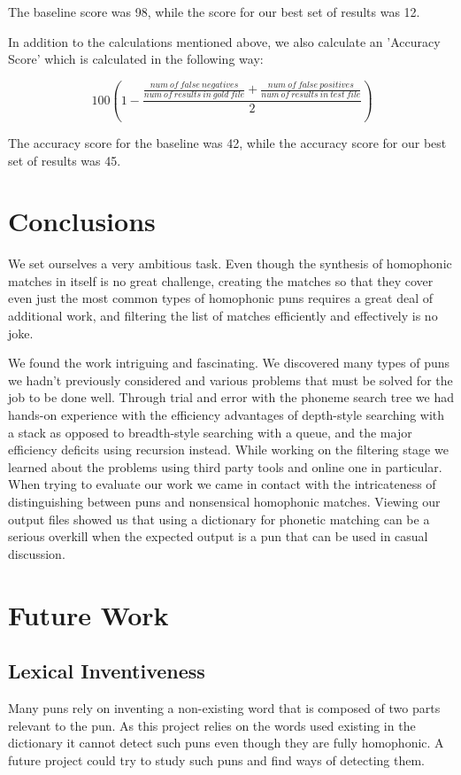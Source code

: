 \documentclass[11pt,a4paper]{article}
\begin{document}
The baseline score was 98, while the score for our best set of results was 12.

In addition to the calculations mentioned above, we also calculate an 'Accuracy Score' which is calculated in the following way:

\[\ 100(1 - \frac{\frac{num\:of\:false\:negatives}{num\:of\:results\:in\:gold\:file} + \frac{num\:of\:false\:positives}{num\:of\:results\:in\:test\:file}}{2})\]

The accuracy score for the baseline was 42, while the accuracy score for our best set of results was 45.

\section{Conclusions}

We set ourselves a very ambitious task. Even though the synthesis of homophonic matches in itself is no great challenge, creating the matches so that they cover even just the most common types of homophonic puns requires a great deal of additional work, and filtering the list of matches efficiently and effectively is no joke.

We found the work intriguing and fascinating. We discovered many types of puns we hadn't previously considered and various problems that must be solved for the job to be done well. Through trial and error with the phoneme search tree we had hands-on experience with the efficiency advantages of depth-style searching with a stack as opposed to breadth-style searching with a queue, and the major efficiency deficits using recursion instead. While working on the filtering stage we learned about the problems using third party tools and online one in particular. When trying to evaluate our work we came in contact with the intricateness of distinguishing between puns and nonsensical homophonic matches. Viewing our output files showed us that using a dictionary for phonetic matching can be a serious overkill when the expected output is a pun that can be used in casual discussion.

\section{Future Work}

\subsection{Lexical Inventiveness}
Many puns rely on inventing a non-existing word that is composed of two parts relevant to the pun. As this project relies on the words used existing in the dictionary it cannot detect such puns even though they are fully homophonic. A future project could try to study such puns and find ways of detecting them.
\end{document}

